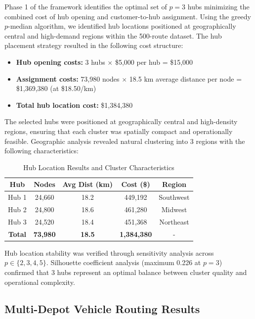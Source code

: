 \documentclass[conference]{IEEEtran}
\begin{document}
Phase 1 of the framework identifies the optimal set of $p=3$ hubs minimizing the combined cost of hub opening and customer-to-hub assignment. Using the greedy $p$-median algorithm, we identified hub locations positioned at geographically central and high-demand regions within the 500-route dataset. The hub placement strategy resulted in the following cost structure:

\begin{itemize}
    \item \textbf{Hub opening costs:} 3 hubs $\times$ \$5,000 per hub = \$15,000
    \item \textbf{Assignment costs:} 73,980 nodes $\times$ 18.5 km average distance per node = \$1,369,380 (at \$18.50/km)
    \item \textbf{Total hub location cost:} \$1,384,380
\end{itemize}

The selected hubs were positioned at geographically central and high-density regions, ensuring that each cluster was spatially compact and operationally feasible. Geographic analysis revealed natural clustering into 3 regions with the following characteristics:

\begin{table}[htbp]
\caption{Hub Location Results and Cluster Characteristics}
\label{tab:hub-results}
\centering
\renewcommand{\arraystretch}{1.3}
\begin{tabular}{|c|c|c|c|c|}
\hline
\textbf{Hub} & \textbf{Nodes} & \textbf{Avg Dist (km)} & \textbf{Cost (\$)} & \textbf{Region} \\
\hline
Hub 1 & 24,660 & 18.2 & 449,192 & Southwest \\
\hline
Hub 2 & 24,800 & 18.6 & 461,280 & Midwest \\
\hline
Hub 3 & 24,520 & 18.4 & 451,368 & Northeast \\
\hline
\textbf{Total} & \textbf{73,980} & \textbf{18.5} & \textbf{1,384,380} & - \\
\hline
\end{tabular}
\end{table}

Hub location stability was verified through sensitivity analysis across $p \in \{2, 3, 4, 5\}$. Silhouette coefficient analysis (maximum 0.226 at $p=3$) confirmed that 3 hubs represent an optimal balance between cluster quality and operational complexity.

\subsection{Multi-Depot Vehicle Routing Results}
\end{document}
